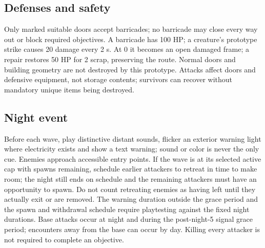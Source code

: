 \subsection{Defenses and safety}
Only marked suitable doors accept barricades; no barricade may close every way out or block required objectives. A barricade has 100 HP; a creature's prototype strike causes 20 damage every 2 s. At 0 it becomes an open damaged frame; a repair restores 50 HP for 2 scrap, preserving the route. Normal doors and building geometry are not destroyed by this prototype. Attacks affect doors and defensive equipment, not storage contents; survivors can recover without mandatory unique items being destroyed.


\subsection{Night event}
Before each wave, play distinctive distant sounds, flicker an exterior warning light where electricity exists and show a text warning; sound or color is never the only cue. Enemies approach accessible entry points. If the wave is at its selected active cap with spawns remaining, schedule earlier attackers to retreat in time to make room; the night still ends on schedule and the remaining attackers must have an opportunity to spawn. Do not count retreating enemies as having left until they actually exit or are removed. The warning duration outside the grace period and the spawn and withdrawal schedule require playtesting against the fixed night durations. Base attacks occur at night and during the post-night-5 signal grace period; encounters away from the base can occur by day. Killing every attacker is not required to complete an objective.


